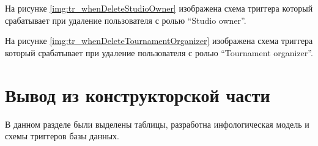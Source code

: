 
На рисунке \ref{img:tr_whenDeleteStudioOwner} изображена схема триггера который срабатывает при удаление пользователя с ролью \textquotedblleft Studio owner\textquotedblright.


На рисунке \ref{img:tr_whenDeleteTournamentOrganizer} изображена схема триггера который срабатывает при удаление пользователя с ролью \textquotedblleft Tournament organizer\textquotedblright.


\section*{Вывод из конструкторской части}
В данном разделе были выделены таблицы, разработна инфологическая модель и  схемы триггеров базы данных.
